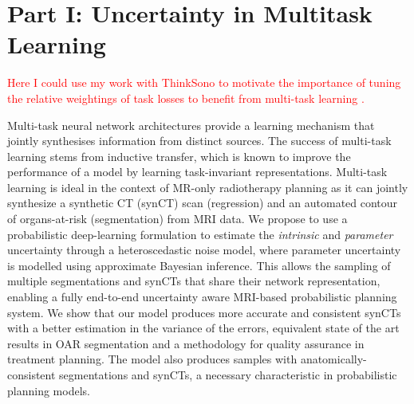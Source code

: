
\chapter{Part I: Uncertainty in Multitask Learning} \label{chapter:multitaskuncertainty_part1}

\textcolor{red}{Here I could use my work with ThinkSono to motivate the importance of tuning the relative weightings of task losses to benefit from multi-task learning \cite{tanno2018autodvt}.}

Multi-task neural network architectures provide a learning mechanism that jointly synthesises information from distinct sources. The success of multi-task learning stems from inductive transfer, which is known to improve the performance of a model by learning task-invariant representations. Multi-task learning is ideal in the context of MR-only radiotherapy planning as it can jointly synthesize a synthetic CT (synCT) scan (regression) and an automated contour of organs-at-risk (segmentation) from MRI data. We propose to use a probabilistic deep-learning formulation to estimate the \textit{intrinsic} and \textit{parameter} uncertainty through a heteroscedastic noise model, where parameter uncertainty is modelled using approximate Bayesian inference. This allows the sampling of multiple segmentations and synCTs that share their network representation, enabling a fully end-to-end uncertainty aware MRI-based probabilistic planning system. We show that our model produces more accurate and consistent synCTs with a better estimation in the variance of the errors, equivalent state of the art results in OAR segmentation and a methodology for quality assurance in treatment planning. The model also produces samples with anatomically-consistent segmentations and synCTs, a necessary characteristic in probabilistic planning models. 

